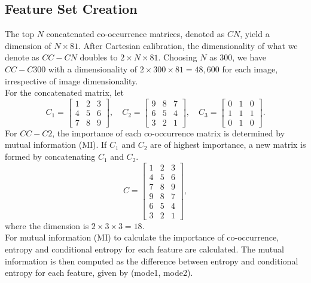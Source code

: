 \subsection{Feature Set Creation}
The top $N$ concatenated co-occurrence matrices, denoted as $CN$, yield a dimension of $N \times 81$. After Cartesian calibration, the dimensionality of what we denote as $CC-CN$ doubles to $2 \times N \times 81$. Choosing $N$ as 300, we have $CC-C300$ with a dimensionality of $2 \times 300 \times 81 = 48,600$ for each image, irrespective of image dimensionality.\\For the concatenated matrix, let
\[
    C_1 = \begin{bmatrix} 1 & 2 & 3 \\ 4 & 5 & 6 \\ 7 & 8 & 9 \end{bmatrix}, \quad
    C_2 = \begin{bmatrix} 9 & 8 & 7 \\ 6 & 5 & 4 \\ 3 & 2 & 1 \end{bmatrix}, \quad
    C_3 = \begin{bmatrix} 0 & 1 & 0 \\ 1 & 1 & 1 \\ 0 & 1 & 0 \end{bmatrix}.
\]
For $CC-C2$, the importance of each co-occurrence matrix is determined by mutual information (MI). If $C_1$ and $C_2$ are of highest importance, a new matrix is formed by concatenating $C_1$ and $C_2$.
\[
    C = \begin{bmatrix} 1 & 2 & 3 \\ 4 & 5 & 6 \\ 7 & 8 & 9 \\ 9 & 8 & 7 \\ 6 & 5 & 4 \\ 3 & 2 & 1 \end{bmatrix},
\]
where the dimension is $2 \times 3 \times 3 = 18$.\\
For mutual information (MI) to calculate the importance of co-occurrence, entropy and conditional entropy for each feature are calculated. The mutual information is then computed as the difference between entropy and conditional entropy for each feature, given by (mode1, mode2).\
\clearpage
